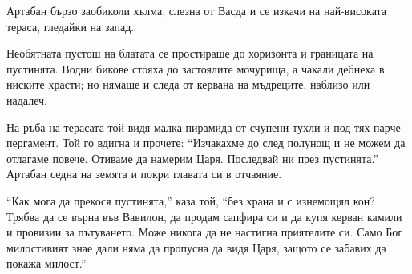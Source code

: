 \documentclass[oneside,10pt]{memoir}
\begin{document}
Артабан бързо заобиколи хълма, слезна от Васда и се изкачи на най-високата
тераса, гледайки на запад.

Необятната пустош на блатата се простираше до хоризонта и границата на
пустинята. Водни бикове стояха до застоялите мочурища, а чакали дебнеха в
ниските храсти; но нямаше и следа от кервана на мъдреците, наблизо или надалеч.

На ръба на терасата той видя малка пирамида от счупени тухли и под тях парче
пергамент. Той го вдигна и прочете: ``Изчакахме до след полунощ и не можем да
отлагаме повече. Отиваме да намерим Царя. Последвай ни през пустинята.'' Артабан
седна на земята и покри главата си в отчаяние.

``Как мога да прекося пустинята,'' каза той, ``без храна и с изнемощял кон?
Трябва да се върна във Вавилон, да продам сапфира си и да купя керван камили и
провизии за пътуването. Може никога да не настигна приятелите си. Само Бог
милостивият знае дали няма да пропусна да видя Царя, защото се забавих да покажа
милост.''
\end{document}
